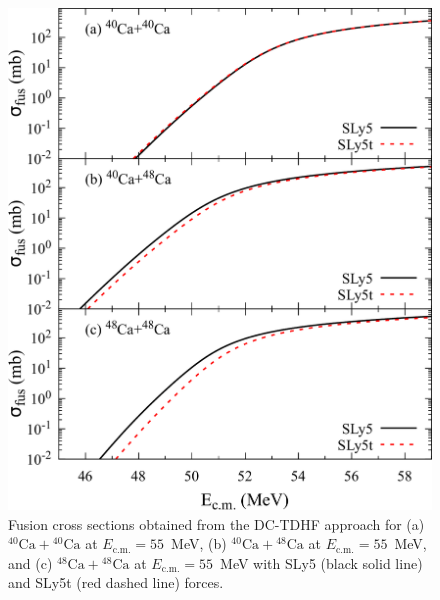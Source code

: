 \begin{figure}
\includegraphics[width=\textwidth]{../Figures/TensorXsec/CrossSections_CaCa.pdf}
\caption{Fusion cross sections obtained from the DC-TDHF approach for (a) $^{40}\mathrm{Ca}+\mathrm{^{40}Ca}$ at $E_{\mathrm{c.m.}}=55$~MeV, (b) $^{40}\mathrm{Ca}+\mathrm{^{48}Ca}$ at $E_{\mathrm{c.m.}}=55$~MeV, and (c) $^{48}\mathrm{Ca}+\mathrm{^{48}Ca}$ at $E_{\mathrm{c.m.}}=55$~MeV with SLy5 (black solid line) and SLy5t (red dashed line) forces.
	\label{Fig:CaCaxsec}}
\end{figure}

